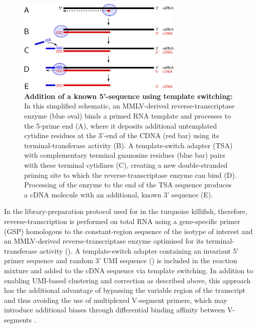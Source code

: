 \begin{figure}
\centering
\includegraphics[width=0.7\textwidth]{_Figures/png_edited/template-switch-labelled}
\vspace{0.5em}
\caption[Addition of a known 5'-sequence with template switching]{\textbf{Addition of a known 5'-sequence using template switching:} In this simplified schematic, an MMLV-derived reverse-transcriptase enzyme (blue oval) binds a primed RNA template and processes to the 5-prime end (A), where it deposits additional untemplated cytidine residues at the 3'-end of the CDNA (red bar) using its terminal-transferase activity (B). A template-switch adapter (TSA) with complementary terminal guanosine residues (blue bar) pairs with these terminal cytidines (C), creating a new double-stranded priming site to which the reverse-transcriptase enzyme can bind (D). Processing of the enzyme to the end of the TSA sequence produces a cDNA molecule with an additional, known 3' sequence (E).}
\label{fig:template-switch-schema}
\end{figure}

In the library-preparation protocol used for \Igseq in the turquoise killifish, therefore, reverse-transcription is performed on total RNA using a gene-specific primer (GSP) homologous to the constant-region sequence of the isotype of interest and an MMLV-derived reverse-transcriptase enzyme optimised for its terminal-transferase activity (). A template-switch adapter containing an invariant 5' primer sequence and random 3' UMI sequence () is included in the reaction mixture and added to the cDNA sequence via template switching. In addition to enabling UMI-based clustering and correction as described above, this approach has the additional advantage of bypassing the variable region of the \igh{} transcript and thus avoiding the use of multiplexed V-segment primers, which may introduce additional biases through differential binding affinity between V-segments \parencite{rosati2017methods}.

